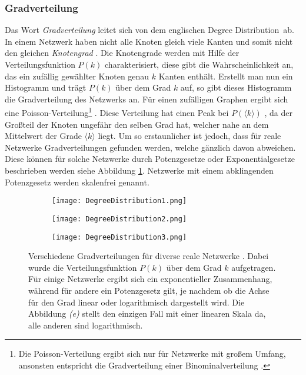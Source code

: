 \documentclass[fontsize=11pt, twoside, a4paper]{scrartcl}
\begin{document}
\subsubsection*{Gradverteilung}
Das Wort \textit{Gradverteilung} leitet sich von dem englischen \glqq Degree Distribution\grqq\, ab. In einem Netzwerk haben nicht alle Knoten gleich viele Kanten und somit nicht den gleichen \textit{Knotengrad} \cite{Albert}. Die Knotengrade werden mit Hilfe der Verteilungsfunktion $P(k)$ charakterisiert, diese gibt die Wahrscheinlichkeit an, das ein zufällig gewählter Knoten genau $k$ Kanten enthält. Erstellt man nun ein Histogramm und trägt $P(k)$ über dem Grad $k$ auf, so gibt dieses Histogramm die Gradverteilung des Netzwerks \cite{Newman} an. Für einen zufälligen Graphen ergibt sich eine Poisson-Verteilung\footnote{Die Poisson-Verteilung ergibt sich nur für Netzwerke mit großem Umfang, ansonsten entspricht die Gradverteilung einer Binominalverteilung \cite{RandomGraphs}.} \cite{RandomGraphs}. Diese Verteilung hat einen Peak bei $P\left(\langle k\rangle\right)$ \cite{Albert}, da der Großteil der Knoten ungefähr den selben Grad hat, welcher nahe an dem Mittelwert der Grade $\langle k\rangle$ liegt. Um so erstaunlicher ist jedoch, dass für reale Netzwerke Gradverteilungen gefunden werden, welche gänzlich davon abweichen. Diese können für solche Netzwerke durch Potenzgesetze oder Exponentialgesetze beschrieben werden \cite{Newman} siehe Abbildung \ref{Gradverteilungen}. Netzwerke mit einem abklingenden Potenzgesetz werden skalenfrei genannt.
\begin{figure}[H]
\centering
	\begin{minipage}[t]{0.6\textwidth}
		\begin{figure}[H]
		\texttt{[image: DegreeDistribution1.png]}
		\end{figure}
	\end{minipage}
	\begin{minipage}[t]{0.6\textwidth}
		\begin{figure}[H]
		\texttt{[image: DegreeDistribution2.png]}
		\end{figure}
	\end{minipage}
	\begin{minipage}[t]{0.6\textwidth}
		\begin{figure}[H]
		\texttt{[image: DegreeDistribution3.png]}
		\end{figure}
	\end{minipage}
	
	\caption{Verschiedene Gradverteilungen für diverse reale Netzwerke \cite{Newman}. Dabei wurde die Verteilungsfunktion $P(k)$ über dem Grad $k$ aufgetragen. Für einige Netzwerke ergibt sich ein exponentieller Zusammenhang, während für andere ein Potenzgesetz gilt, je nachdem ob die Achse für den Grad linear oder logarithmisch dargestellt wird. Die Abbildung \textit{(e)} stellt den einzigen Fall mit einer linearen Skala da, alle anderen sind logarithmisch.}
	\label{Gradverteilungen}
\end{figure}
\end{document}

